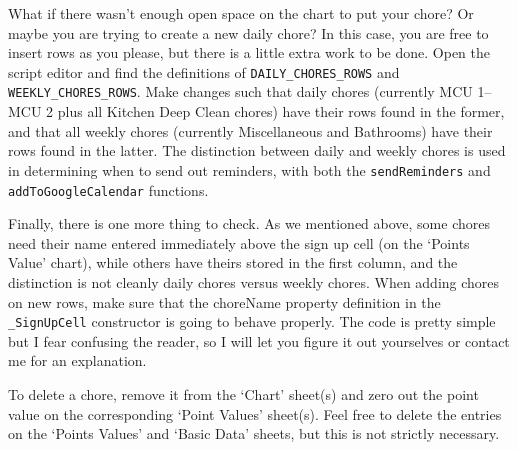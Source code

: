 \documentclass{article}
\begin{document}
What if there wasn't enough open space on the chart to put your chore?
Or maybe you are trying to create a new daily chore?
In this case, you are free to insert rows as you please, but there is a little extra work to be done.
Open the script editor and find the definitions of \texttt{DAILY\_CHORES\_ROWS} and \texttt{WEEKLY\_CHORES\_ROWS}.
Make changes such that daily chores (currently MCU 1--MCU 2 plus all Kitchen Deep Clean chores) have their rows found in the former, and that all weekly chores (currently Miscellaneous and Bathrooms) have their rows found in the latter.
The distinction between daily and weekly chores is used in determining when to send out reminders, with both the \texttt{sendReminders} and
\texttt{addToGoogleCalendar} functions.

Finally, there is one more thing to check.
As we mentioned above, some chores need their name entered immediately above the sign up cell (on the `Points Value' chart), while others have theirs stored in the first column, and the distinction is not cleanly daily chores versus weekly chores.
When adding chores on new rows, make sure that the choreName property definition in the \texttt{\_SignUpCell} constructor is going to behave properly.
The code is pretty simple but I fear confusing the reader, so I will let you figure it out yourselves or contact me for an explanation.

To delete a chore, remove it from the `Chart' sheet(s) and zero out the point value on the corresponding `Point Values' sheet(s).
Feel free to delete the entries on the `Points Values' and `Basic Data' sheets, but this is not strictly necessary.
\end{document}
